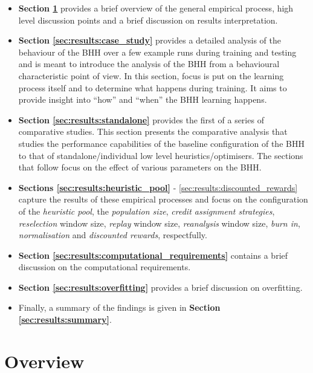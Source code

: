 \begin{itemize}
    \item \textbf{Section \ref{sec:results:overview}} provides a brief overview of the general empirical process, high level discussion points and a brief discussion on results interpretation.
    
    \item \textbf{Section \ref{sec:results:case_study}} provides a detailed analysis of the behaviour of the \Acs{BHH} over a few example runs during training and testing and is meant to introduce the analysis of the \Acs{BHH} from a behavioural characteristic point of view. In this section, focus is put on the learning process itself and to determine what happens during training. It aims to provide insight into ``how'' and ``when'' the \Acs{BHH} learning happens.
    
    \item \textbf{Section \ref{sec:results:standalone}} provides the first of a series of comparative studies. This section presents the comparative analysis that studies the performance capabilities of the baseline configuration of the \Acs{BHH} to that of standalone/individual low level heuristics/optimisers. The sections that follow focus on the effect of various parameters on the \Acs{BHH}.
    
    \item \textbf{Sections \ref{sec:results:heuristic_pool}} - \ref{sec:results:discounted_rewards} capture the results of these empirical processes and focus on the configuration of the \textit{heuristic pool}, the \textit{population size}, \textit{credit assignment strategies}, \textit{reselection} window size, \textit{replay} window size, \textit{reanalysis} window size, \textit{burn in}, \textit{normalisation} and \textit{discounted rewards}, respectfully.
    
    \item \textbf{Section \ref{sec:results:computational_requirements}} contains a brief discussion on the computational requirements.
    
    \item \textbf{Section \ref{sec:results:overfitting}} provides a brief discussion on overfitting.
    
    \item Finally, a summary of the findings is given in \textbf{Section \ref{sec:results:summary}}.
\end{itemize}

\section{Overview}
\label{sec:results:overview}

